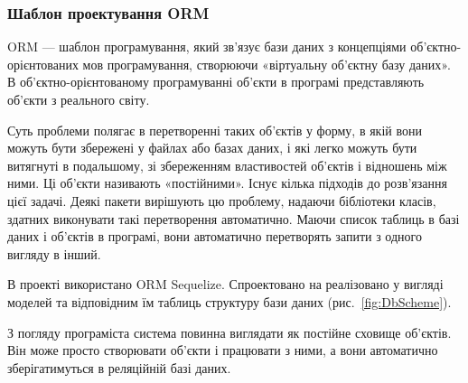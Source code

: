 \subsubsection{Шаблон проектування ORM} \label{subs:orm}

ORM — шаблон програмування, який зв'язує бази даних з концепціями об'єктно-орієнтованих мов програмування, створюючи «віртуальну об'єктну базу даних». В об'єктно-орієнтованому програмуванні об'єкти в програмі представляють об'єкти з реального світу. 

Суть проблеми полягає в перетворенні таких об'єктів у форму, в якій вони можуть бути збережені у файлах або базах даних, і які легко можуть бути витягнуті в подальшому, зі збереженням властивостей об'єктів і відношень між ними. Ці об'єкти називають «постійними». Існує кілька підходів до розв'язання цієї задачі. Деякі пакети вирішують цю проблему, надаючи бібліотеки класів, здатних виконувати такі перетворення автоматично. Маючи список таблиць в базі даних і об'єктів в програмі, вони автоматично перетворять запити з одного вигляду в інший.

В проекті використано ORM Sequelize. Спроектовано на реалізовано у вигляді моделей та відповідним їм таблиць структуру бази даних (рис.~\ref{fig:DbScheme}).


З погляду програміста система повинна виглядати як постійне сховище об'єктів. Він може просто створювати об'єкти і працювати з ними, а вони автоматично зберігатимуться в реляційній базі даних.
